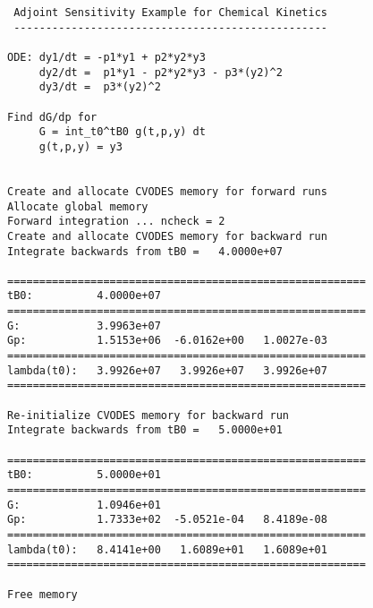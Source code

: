 \begin{verbatim}
 Adjoint Sensitivity Example for Chemical Kinetics
 -------------------------------------------------

ODE: dy1/dt = -p1*y1 + p2*y2*y3
     dy2/dt =  p1*y1 - p2*y2*y3 - p3*(y2)^2
     dy3/dt =  p3*(y2)^2

Find dG/dp for
     G = int_t0^tB0 g(t,p,y) dt
     g(t,p,y) = y3


Create and allocate CVODES memory for forward runs
Allocate global memory
Forward integration ... ncheck = 2
Create and allocate CVODES memory for backward run
Integrate backwards from tB0 =   4.0000e+07

========================================================
tB0:          4.0000e+07 
========================================================
G:            3.9963e+07 
Gp:           1.5153e+06  -6.0162e+00   1.0027e-03
========================================================
lambda(t0):   3.9926e+07   3.9926e+07   3.9926e+07
========================================================

Re-initialize CVODES memory for backward run
Integrate backwards from tB0 =   5.0000e+01

========================================================
tB0:          5.0000e+01 
========================================================
G:            1.0946e+01 
Gp:           1.7333e+02  -5.0521e-04   8.4189e-08
========================================================
lambda(t0):   8.4141e+00   1.6089e+01   1.6089e+01
========================================================

Free memory
\end{verbatim}